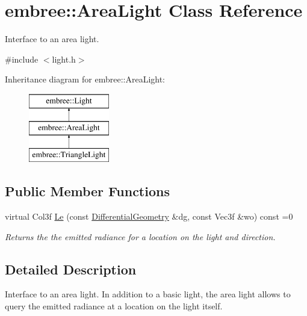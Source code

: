 \hypertarget{classembree_1_1_area_light}{
\section{embree::AreaLight Class Reference}
\label{classembree_1_1_area_light}
}


Interface to an area light.  




{\ttfamily \#include $<$light.h$>$}

Inheritance diagram for embree::AreaLight:\begin{figure}[H]
\begin{center}
\leavevmode
\includegraphics[height=3.000000cm]{classembree_1_1_area_light}
\end{center}
\end{figure}
\subsection*{Public Member Functions}
\begin{DoxyCompactItemize}
\item 
virtual Col3f \hyperlink{classembree_1_1_area_light_aee1e622de193947d1b089231b230e1e2}{Le} (const \hyperlink{structembree_1_1_differential_geometry}{DifferentialGeometry} \&dg, const Vec3f \&wo) const =0
\begin{DoxyCompactList}\small\item\em Returns the the emitted radiance for a location on the light and direction. \item\end{DoxyCompactList}\end{DoxyCompactItemize}


\subsection{Detailed Description}
Interface to an area light. In addition to a basic light, the area light allows to query the emitted radiance at a location on the light itself. 

